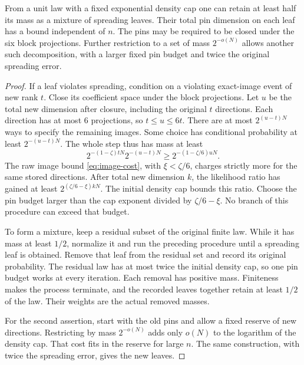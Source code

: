 \begin{lemma}\label{lem:closed-peeling}
From a unit law with a fixed exponential density cap one can retain
at least half its mass as a mixture of spreading leaves. Their total pin
dimension on each leaf has a bound independent of \(n\). The pins
may be required to be closed under the six block projections. Further
restriction to a set of mass \(2^{-o(N)}\) allows another such decomposition,
with a larger fixed pin budget and twice the original spreading error.
\end{lemma}
\begin{proof}
If a leaf violates spreading, condition on a violating exact-image event
of new rank \(t\). Close its coefficient space under the block projections.
Let \(u\) be the total new dimension after closure, including the
original \(t\) directions. Each direction has at most 6 projections, so
\(t\le u\le6t\). There are at most \(2^{(u-t)N}\) ways to specify the
remaining images. Some choice has conditional probability at least
\(2^{-(u-t)N}\). The whole step thus has mass at least
\[
 2^{-(1-\zeta)tN}2^{-(u-t)N}
 \ge2^{-(1-\zeta/6)uN}.
\]
The raw image bound \eqref{eq:image-cost}, with \(\xi<\zeta/6\), charges
strictly more for the same stored directions. After total new dimension
\(k\), the likelihood ratio has gained at least
\(2^{(\zeta/6-\xi)kN}\). The initial density cap bounds this ratio.
Choose the pin budget larger than the cap exponent divided by
\(\zeta/6-\xi\). No branch of this procedure can exceed that budget.

To form a mixture, keep a residual subset of the original finite law.
While it has mass at least \(1/2\), normalize it and run the preceding
procedure until a spreading leaf is obtained. Remove that leaf from the
residual set and record its original probability. The residual law has
at most twice the initial density cap, so one pin budget works at every
iteration. Each removal has positive mass. Finiteness makes the process
terminate, and the recorded leaves together retain at least \(1/2\) of
the law. Their weights are the actual removed masses.

For the second assertion, start with the old pins and allow a fixed reserve
of new directions. Restricting by mass \(2^{-o(N)}\) adds only \(o(N)\)
to the logarithm of the density cap. That cost fits in the reserve for
large \(n\). The same construction, with twice the spreading error,
gives the new leaves.
\end{proof}

